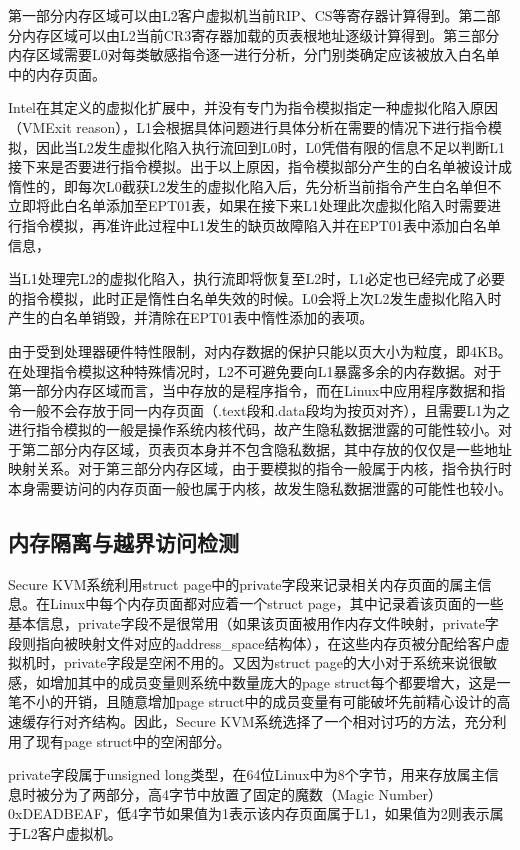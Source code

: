 第一部分内存区域可以由L2客户虚拟机当前RIP、CS等寄存器计算得到。第二部分内存区域可以由L2当前CR3寄存器加载的页表根地址逐级计算得到。第三部分内存区域需要L0对每类敏感指令逐一进行分析，分门别类确定应该被放入白名单中的内存页面。

Intel在其定义的虚拟化扩展中，并没有专门为指令模拟指定一种虚拟化陷入原因（VMExit reason），L1会根据具体问题进行具体分析在需要的情况下进行指令模拟，因此当L2发生虚拟化陷入执行流回到L0时，L0凭借有限的信息不足以判断L1接下来是否要进行指令模拟。出于以上原因，指令模拟部分产生的白名单被设计成惰性的，即每次L0截获L2发生的虚拟化陷入后，先分析当前指令产生白名单但不立即将此白名单添加至EPT01表，如果在接下来L1处理此次虚拟化陷入时需要进行指令模拟，再准许此过程中L1发生的缺页故障陷入并在EPT01表中添加白名单信息，

当L1处理完L2的虚拟化陷入，执行流即将恢复至L2时，L1必定也已经完成了必要的指令模拟，此时正是惰性白名单失效的时候。L0会将上次L2发生虚拟化陷入时产生的白名单销毁，并清除在EPT01表中惰性添加的表项。

由于受到处理器硬件特性限制，对内存数据的保护只能以页大小为粒度，即4KB。在处理指令模拟这种特殊情况时，L2不可避免要向L1暴露多余的内存数据。对于第一部分内存区域而言，当中存放的是程序指令，而在Linux中应用程序数据和指令一般不会存放于同一内存页面（.text段和.data段均为按页对齐），且需要L1为之进行指令模拟的一般是操作系统内核代码，故产生隐私数据泄露的可能性较小。对于第二部分内存区域，页表页本身并不包含隐私数据，其中存放的仅仅是一些地址映射关系。对于第三部分内存区域，由于要模拟的指令一般属于内核，指令执行时本身需要访问的内存页面一般也属于内核，故发生隐私数据泄露的可能性也较小。

\subsection{内存隔离与越界访问检测}
Secure KVM系统利用struct page中的private字段来记录相关内存页面的属主信息。在Linux中每个内存页面都对应着一个struct page，其中记录着该页面的一些基本信息，private字段不是很常用（如果该页面被用作内存文件映射，private字段则指向被映射文件对应的address\_space结构体），在这些内存页被分配给客户虚拟机时，private字段是空闲不用的。又因为struct page的大小对于系统来说很敏感，如增加其中的成员变量则系统中数量庞大的page struct每个都要增大，这是一笔不小的开销，且随意增加page struct中的成员变量有可能破坏先前精心设计的高速缓存行对齐结构。因此，Secure KVM系统选择了一个相对讨巧的方法，充分利用了现有page struct中的空闲部分。

private字段属于unsigned long类型，在64位Linux中为8个字节，用来存放属主信息时被分为了两部分，高4字节中放置了固定的魔数（Magic Number）0xDEADBEAF，低4字节如果值为1表示该内存页面属于L1，如果值为2则表示属于L2客户虚拟机。

